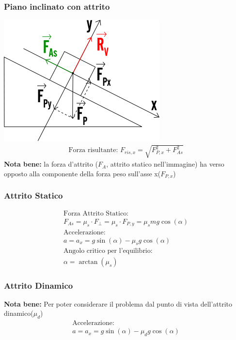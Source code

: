 \subsubsection{Piano inclinato con attrito}
\includegraphics[width=0.75 \linewidth]{Dinamica/piano-inclinato-con-attrito.png} \\
\begin{gather*}
    \text{Forza risultante: } F_{ris, x} = \sqrt{F_{P, x}^2 + F_{As}^2}
\end{gather*}
\textbf{Nota bene: } la forza d'attrito ($F_{A}$, attrito statico nell'immagine) ha verso opposto alla componente della forza peso sull'asse x($F_{P, x}$)
\subsubsection{Attrito Statico}
\begin{gather*}
    \text{Forza Attrito Statico: } \\ F_{As} = \mu_s \cdot F_\perp = \mu_s \cdot F_{P, y} = \mu_s m g \cos (\alpha) \\
    \text{Accelerazione: } \\ a = a_x = g \sin (\alpha) - \mu_s g \cos (\alpha) \\
    \text{Angolo critico per l'equilibrio: } \\ \alpha = \arctan (\mu_s)
\end{gather*}
\subsubsection{Attrito Dinamico}
\textbf{Nota bene: } Per poter considerare il problema dal punto di vista dell'attrito dinamico($\mu_d$)
\begin{gather*}
    \text{Accelerazione: } \\ a = a_x = g \sin (\alpha) - \mu_d g \cos (\alpha)
\end{gather*}